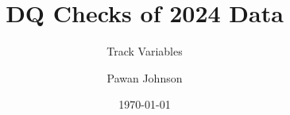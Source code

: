 \documentclass{beamer}
\title{DQ Checks of 2024 Data}
\subtitle{Track Variables}
\author{Pawan Johnson}
\institute{University of Liverpool}
\date{\today}
\begin{document}
\begingroup
{}
\begin{frame}
    \maketitle
\end{frame}
\endgroup







\appendix
\appendsubframes
\end{document}
